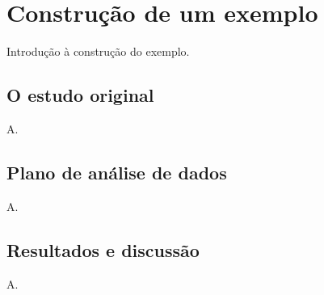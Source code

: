 \section{Construção de um exemplo}

Introdução à construção do exemplo.

\subsection{O estudo original}

A.

\subsection{Plano de análise de dados}

A.

\subsection{Resultados e discussão}

A.
